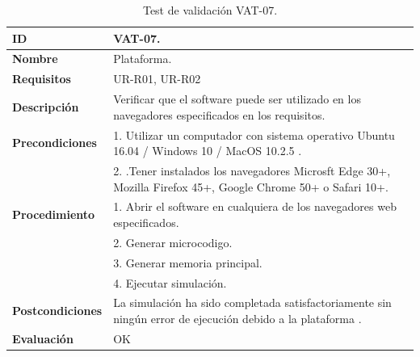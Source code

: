\begin{center}
\begin{table}[htbp]
\centering
\caption{Test de validación VAT-07.}
\begin{tabular}{@{}p{2.5cm} p{13cm}@{}} 
\toprule
\textbf{ID} 					& VAT-07. \\
\midrule
\textbf{Nombre} 				& Plataforma. \\
\midrule
\textbf{Requisitos} 		& UR-R01, UR-R02\\
\midrule
\textbf{Descripción} 		& Verificar que el \gls{software} puede ser utilizado en los navegadores especificados en los requisitos. \\
\midrule
\textbf{Precondiciones}		& 1. Utilizar un computador con sistema operativo Ubuntu 16.04 / Windows 10 / MacOS 10.2.5 .\\
							& 2. .Tener instalados los navegadores Microsft Edge 30+, Mozilla Firefox 45+, Google Chrome 50+ o Safari 10+. \\
\midrule
\textbf{Procedimiento}			& 1. Abrir el \gls{software} en cualquiera de los navegadores web especificados. \\
							& 2. Generar \gls{microcodigo}.\\
							& 3. Generar memoria principal.\\
							& 4. Ejecutar simulación.\\
\midrule
\textbf{Postcondiciones} 		&  La simulación ha sido completada satisfactoriamente sin ningún error de ejecución debido a la plataforma .\\
\midrule
\textbf{Evaluación} 			& OK \\
\bottomrule
\end{tabular}
\label{tab:vat-07}
\end{table}
\end{center}

\vspace{-1.5cm}


